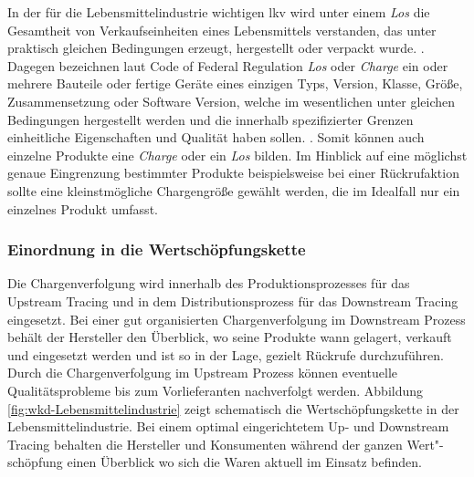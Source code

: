 In der für die Lebensmittelindustrie wichtigen \ac{lkv} wird unter einem \textit{Los} \glqq die Gesamtheit von Verkaufseinheiten eines Lebensmittels verstanden, das unter praktisch gleichen Bedingungen erzeugt, hergestellt oder verpackt wurde.\grqq{} \citep{LKV1993}. Dagegen bezeichnen laut Code of Federal Regulation \textit{Los} oder \textit{Charge} \glqq ein oder mehrere Bauteile oder fertige Geräte eines einzigen Typs, Version, Klasse, Größe, Zusammensetzung oder Software Version, welche im wesentlichen unter gleichen Bedingungen hergestellt werden und die innerhalb spezifizierter Grenzen einheitliche Eigenschaften und Qualität haben sollen.\grqq{} \citep{QSR1996}. Somit können auch einzelne Produkte eine \textit{Charge} oder ein \textit{Los} bilden. Im Hinblick auf eine möglichst genaue Eingrenzung bestimmter Produkte beispielsweise bei einer Rückrufaktion sollte eine kleinstmögliche Chargengröße gewählt werden, die im Idealfall nur ein einzelnes Produkt umfasst.

\subsubsection{Einordnung in die Wertschöpfungskette}

Die Chargenverfolgung wird innerhalb des Produktionsprozesses für das Upstream Tracing und in dem Distributionsprozess für das Downstream Tracing eingesetzt. Bei einer gut organisierten Chargenverfolgung im Downstream Prozess behält der Hersteller den Überblick, wo seine Produkte wann gelagert, verkauft und eingesetzt werden und ist so in der Lage, gezielt Rückrufe durchzuführen. Durch die Chargenverfolgung im Upstream Prozess können eventuelle Qualitätsprobleme bis zum Vorlieferanten nachverfolgt werden. Abbildung \ref{fig:wkd-Lebensmittelindustrie} zeigt schematisch die Wertschöpfungskette in der Lebensmittelindustrie. Bei einem optimal eingerichtetem Up- und Downstream Tracing behalten die Hersteller und Konsumenten während der ganzen Wert"-schöpfung einen Überblick wo sich die Waren aktuell im Einsatz befinden.


